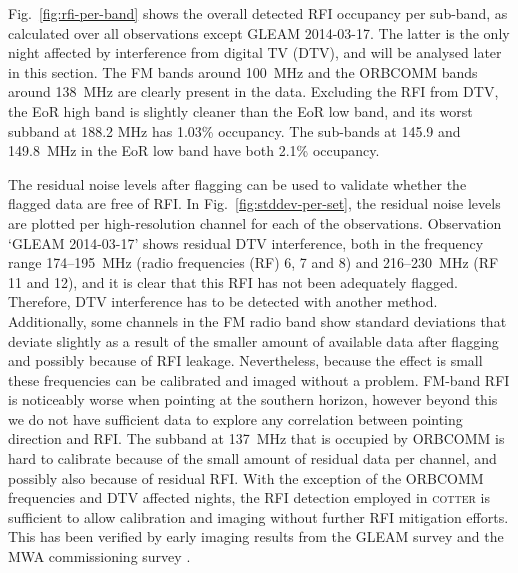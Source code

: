 \documentclass{pasa}
\begin{document}
Fig.~\ref{fig:rfi-per-band} shows the overall detected RFI occupancy per sub-band, as calculated over all observations except GLEAM 2014-03-17. The latter is the only night affected by interference from digital TV (DTV), and will be analysed later in this section. The FM bands around 100~MHz and the ORBCOMM bands around 138~MHz are clearly present in the data. Excluding the RFI from DTV, the EoR high band is slightly cleaner than the EoR low band, and its worst subband at 188.2 MHz has 1.03\% occupancy. The sub-bands at 145.9 and 149.8~MHz in the EoR low band have both 2.1\% occupancy.

The residual noise levels after flagging can be used to validate whether the flagged data are free of RFI. In Fig.~\ref{fig:stddev-per-set}, the residual noise levels are plotted per high-resolution channel for each of the observations. Observation `GLEAM 2014-03-17' shows residual DTV interference, both in the frequency range 174--195~MHz (radio frequencies (RF) 6, 7 and 8) and 216--230~MHz (RF 11 and 12), and it is clear that this RFI has not been adequately flagged. Therefore, DTV interference has to be detected with another method. Additionally, some channels in the FM radio band show standard deviations that deviate slightly as a result of the smaller amount of available data after flagging and possibly because of RFI leakage. Nevertheless, because the effect is small these frequencies can be calibrated and imaged without a problem. FM-band RFI is noticeably worse when pointing at the southern horizon, however beyond this we do not have sufficient data to explore any correlation between pointing direction and RFI. The subband at 137~MHz that is occupied by ORBCOMM is hard to calibrate because of the small amount of residual data per channel, and possibly also because of residual RFI. With the exception of the ORBCOMM frequencies and DTV affected nights, the RFI detection employed in \textsc{cotter} is sufficient to allow calibration and imaging without further RFI mitigation efforts. This has been verified by early imaging results from the GLEAM survey and the MWA commissioning survey \citep{hindson-cluster-emission-2014, mwacs-2014, murphy-mwa-exoplanets-2014}.
\end{document}
